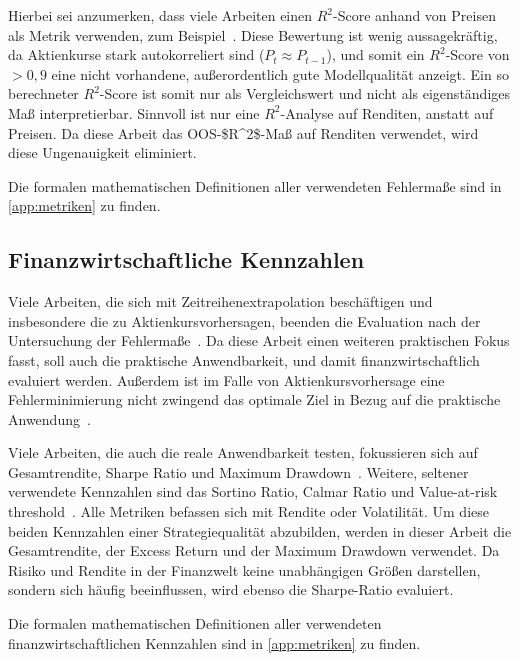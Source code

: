 Hierbei sei anzumerken, dass viele Arbeiten einen $R^2$-Score anhand von Preisen als Metrik verwenden, zum Beispiel~\cite{lstmaro2023,lstm_gru_trends2024,tan2024comparing,balamohal2023lstmup}. Diese Bewertung ist wenig aussagekräftig, da Aktienkurse stark autokorreliert sind ($P_t \approx P_{t-1}$), und somit ein $R^2$-Score von $>0,9$ eine nicht vorhandene, außerordentlich gute Modellqualität anzeigt. Ein so berechneter $R^2$-Score ist somit nur als Vergleichswert und nicht als eigenständiges Maß interpretierbar. Sinnvoll ist nur eine $R^2$-Analyse auf Renditen, anstatt auf Preisen. Da diese Arbeit das \ac{OOS-$R^2$}-Maß auf Renditen verwendet, wird diese Ungenauigkeit eliminiert.

Die formalen mathematischen Definitionen aller verwendeten Fehlermaße sind in \cref{app:metriken} zu finden.

\subsection{Finanzwirtschaftliche Kennzahlen}\label{subsec:finanzkennzahlen}

Viele Arbeiten, die sich mit Zeitreihenextrapolation beschäftigen und insbesondere die zu Aktienkursvorhersagen, beenden die Evaluation nach der Untersuchung der Fehlermaße~\cite{gandhmal2019systematic}. Da diese Arbeit einen weiteren praktischen Fokus fasst, soll auch die praktische Anwendbarkeit, und damit finanzwirtschaftlich evaluiert werden. Außerdem ist im Falle von Aktienkursvorhersage eine Fehlerminimierung nicht zwingend das optimale Ziel in Bezug auf die praktische Anwendung~\cite{sharpe_optimized2025}.

Viele Arbeiten, die auch die reale Anwendbarkeit testen, fokussieren sich auf Gesamtrendite, Sharpe Ratio und Maximum Drawdown~\cite{ensemble_drl2025,longshort2024,lstm_trading_twse2025}. Weitere, seltener verwendete Kennzahlen sind das Sortino Ratio, Calmar Ratio und Value-at-risk threshold~\cite{Olorunnimbe2023}. Alle Metriken befassen sich mit Rendite oder Volatilität. Um diese beiden Kennzahlen einer Strategiequalität abzubilden, werden in dieser Arbeit die Gesamtrendite, der Excess Return und der Maximum Drawdown verwendet. Da Risiko und Rendite in der Finanzwelt keine unabhängigen Größen darstellen, sondern sich häufig beeinflussen, wird ebenso die Sharpe-Ratio evaluiert.

Die formalen mathematischen Definitionen aller verwendeten finanzwirtschaftlichen Kennzahlen sind in \cref{app:metriken} zu finden.